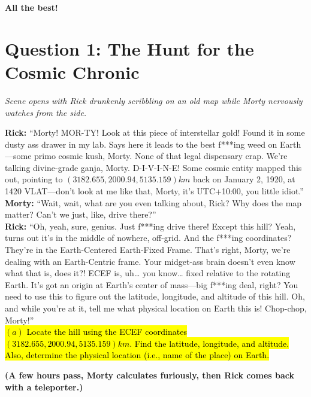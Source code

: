 \documentclass[a4paper, 12pt]{exam}
\begin{document}
	\begin{center}
		\textbf{All the best!}
	\end{center}
		
	\pagebreak
	
	

	\section*{Question 1: The Hunt for the Cosmic Chronic}

\noindent \textit{Scene opens with Rick drunkenly scribbling on an old map while Morty nervously watches from the side.}

\bigskip
\noindent \textbf{Rick:} “Morty! MOR-TY! Look at this piece of interstellar gold! Found it in some dusty ass drawer in my lab. Says here it leads to the best f***ing weed on Earth—some primo cosmic kush, Morty. None of that legal dispensary crap. We’re talking divine-grade ganja, Morty. D-I-V-I-N-E! Some cosmic entity mapped this out, pointing to $(3182.655, 2000.94, 5135.159) km$ back on January 2, 1920, at 1420 VLAT—don’t look at me like that, Morty, it’s UTC+10:00, you little idiot.” \\

\noindent \textbf{Morty:} “Wait, wait, what are you even talking about, Rick? Why does the map matter? Can’t we just, like, drive there?” \\

\noindent \textbf{Rick:} “Oh, yeah, sure, genius. Just f***ing drive there! Except this hill? Yeah, turns out it’s in the middle of nowhere, off-grid. And the f***ing coordinates? They’re in the Earth-Centered Earth-Fixed Frame. That’s right, Morty, we’re dealing with an Earth-Centric frame. Your midget-ass brain doesn’t even know what that is, does it?! ECEF is, uh… you know… fixed relative to the rotating Earth. It’s got an origin at Earth’s center of mass—big f***ing deal, right? You need to use this to figure out the latitude, longitude, and altitude of this hill. Oh, and while you’re at it, tell me what physical location on Earth this is! Chop-chop, Morty!” \\

\hl{$(a)$ Locate the hill using the ECEF coordinates $(3182.655, 2000.94, 5135.159) km$. Find the latitude, longitude, and altitude. Also, determine the physical location (i.e., name of the place) on Earth.}

\bigskip
\noindent \textbf{(A few hours pass, Morty calculates furiously, then Rick comes back with a teleporter.)} \\
\end{document}

